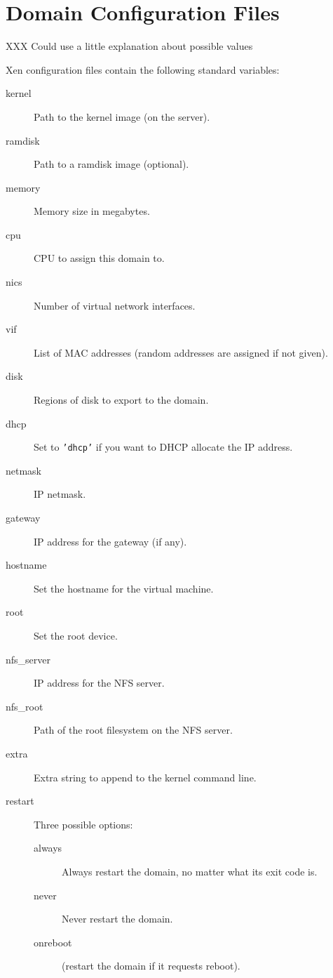 \documentclass[11pt,twoside,final,openright]{xenstyle}
\begin{document}
\chapter{Domain Configuration Files}
\label{cha:config}

XXX Could use a little explanation about possible values

Xen configuration files contain the following standard variables:

\begin{description}
\item[kernel] Path to the kernel image (on the server).
\item[ramdisk] Path to a ramdisk image (optional).
\item[memory] Memory size in megabytes.
\item[cpu] CPU to assign this domain to.
\item[nics] Number of virtual network interfaces.
\item[vif] List of MAC addresses (random addresses are assigned if not given).
\item[disk] Regions of disk to export to the domain.
\item[dhcp] Set to {\tt 'dhcp'} if you want to DHCP allocate the IP address.
\item[netmask] IP netmask.
\item[gateway] IP address for the gateway (if any).
\item[hostname] Set the hostname for the virtual machine.
\item[root] Set the root device.
\item[nfs\_server] IP address for the NFS server.
\item[nfs\_root] Path of the root filesystem on the NFS server.
\item[extra] Extra string to append to the kernel command line.
\item[restart] Three possible options:
  \begin{description}
  \item[always] Always restart the domain, no matter what
                its exit code is.
  \item[never]  Never restart the domain.
  \item[onreboot] (restart the domain if it requests reboot).
  \end{description}
\end{description}
\end{document}
